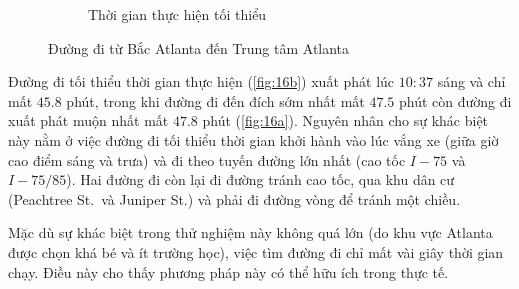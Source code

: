 \documentclass[../main.tex]{subfiles}
\begin{document}
\begin{figure}
\begin{subfigure}{0.5\textwidth}
        \caption{Thời gian thực hiện tối thiểu}
        \label{fig:16b}
    \end{subfigure}
    \caption{Đường đi từ Bắc Atlanta đến Trung tâm Atlanta}
    \label{fig:16}
\end{figure}


Đường đi tối thiểu thời gian thực
hiện (\autoref{fig:16b}) xuất phát lúc \(10:37\) sáng và chỉ mất \(45.8\) phút,
trong khi đường đi đến đích sớm nhất mất \(47.5\) phút còn đường đi xuất
phát muộn nhất mất \(47.8\) phút (\autoref{fig:16a}). Nguyên nhân cho sự khác
biệt này nằm ở việc đường đi tối thiểu thời gian khởi hành vào lúc vắng
xe (giữa giờ cao điểm sáng và trưa) và đi theo tuyến đường lớn nhất (cao
tốc \(I-75\) và \(I-75/85\)). Hai đường đi còn lại đi đường tránh cao
tốc, qua khu dân cư (Peachtree St.~và Juniper St.) và phải đi đường vòng
để tránh một chiều.

Mặc dù sự khác biệt trong thử nghiệm này không quá lớn (do khu vực
Atlanta được chọn khá bé và ít trường học), việc tìm đường đi chỉ mất
vài giây thời gian chạy. Điều này cho thấy phương pháp này có thể hữu
ích trong thực tế.
\backmatter
\end{document}
